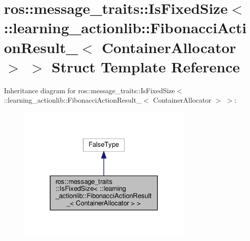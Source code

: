 \hypertarget{structros_1_1message__traits_1_1IsFixedSize_3_01_1_1learning__actionlib_1_1FibonacciActionResult82943ddb027f62ce2acce57b1a8d7ee3}{}\section{ros\+:\+:message\+\_\+traits\+:\+:Is\+Fixed\+Size$<$ \+:\+:learning\+\_\+actionlib\+:\+:Fibonacci\+Action\+Result\+\_\+$<$ Container\+Allocator $>$ $>$ Struct Template Reference}
\label{structros_1_1message__traits_1_1IsFixedSize_3_01_1_1learning__actionlib_1_1FibonacciActionResult82943ddb027f62ce2acce57b1a8d7ee3}


Inheritance diagram for ros\+:\+:message\+\_\+traits\+:\+:Is\+Fixed\+Size$<$ \+:\+:learning\+\_\+actionlib\+:\+:Fibonacci\+Action\+Result\+\_\+$<$ Container\+Allocator $>$ $>$\+:
\nopagebreak
\begin{figure}[H]
\begin{center}
\leavevmode
\includegraphics[width=242pt]{structros_1_1message__traits_1_1IsFixedSize_3_01_1_1learning__actionlib_1_1FibonacciActionResult523365900c4df09c40d472ba9a4796de}
\end{center}
\end{figure}


